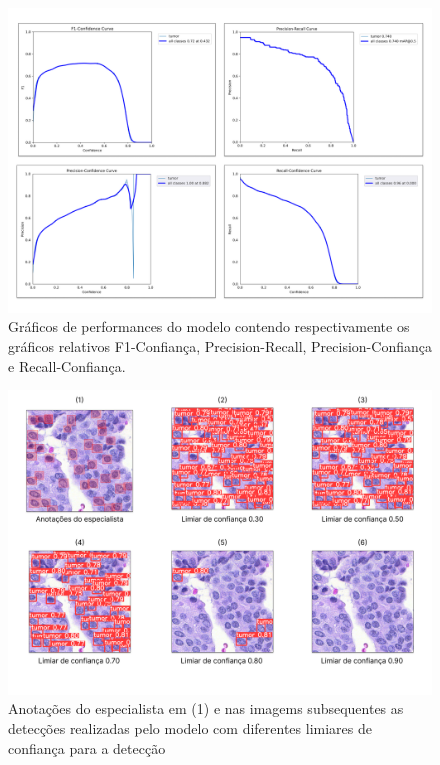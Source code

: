 \documentclass[12pt]{article}
\begin{document}
\begin{figure}[ht]
  \centering
  \includegraphics[width=1\textwidth]{images/graph_results.png}
  \caption{Gráficos de performances do modelo contendo respectivamente os gráficos relativos F1-Confiança, Precision-Recall, Precision-Confiança e Recall-Confiança.}
  \label{fig:graph}
\end{figure}

\begin{figure}[ht]
  \centering
  \includegraphics[width=1\textwidth]{images/confidence_threshold.png}
  \caption{Anotações do especialista em (1) e nas imagems subsequentes as detecções realizadas pelo modelo com diferentes limiares de confiança para a detecção}
  \label{fig:confidence_threshold}
\end{figure}
\end{document}
